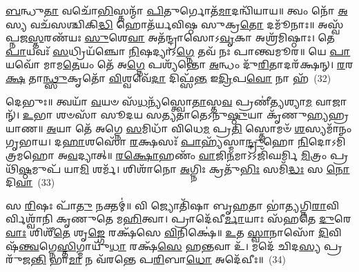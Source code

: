 \-\ul{𑌬}\-𑌨𑍍𑌧𑍁\-\ul{𑌤𑌾} 𑌵𑌚𑍋᳴\-\ul{𑌭𑌿}\-𑌸𑍍𑌤𑌨𑍍𑌮𑌾᳴ \ul{𑌪𑌿}\-𑌤𑍁𑌰𑍍𑌗𑍋𑌤᳴\-\ul{𑌮𑌾}\-𑌦𑌨𑍍𑌵𑌿᳴𑌯𑌾𑌯॥ 𑌤𑍍𑌵𑌂 𑌨𑍋᳴ \ul{𑌅}\-𑌸𑍍𑌯 𑌵𑌚᳴𑌸𑌶𑍍𑌚𑌿𑌕𑌿\-\ul{𑌦𑍍𑌧𑌿} 𑌹𑍋𑌤᳴𑌰𑍍𑌯𑌵𑌿𑌷𑍍𑌠 𑌸𑍁𑌕𑍍𑌰\-\ul{𑌤𑍋} 𑌦𑌮𑍂᳴𑌨𑌾𑌃॥ 𑌅𑌸𑍍𑌵᳴𑌪𑍍𑌨𑌜\-\ul{𑌸𑍍𑌤}\-𑌰𑌣᳴𑌯𑌃 \ul{𑌸𑍁}\-𑌶𑍇\-\ul{𑌵𑌾} 𑌅𑌤᳴𑌨𑍍𑌦𑍍𑌰𑌾𑌸𑍋\-𑌽\-\ul{𑌵𑍃}\-𑌕𑌾 𑌅𑌶𑍍𑌰᳴𑌮𑌿𑌷𑍍𑌠𑌾𑌃। 𑌤𑍇 \ul{𑌪𑌾}\-𑌯𑌵𑌃᳴ \ul{𑌸}\-𑌧𑍍𑌰𑌿𑌯᳴𑌞𑍍𑌚𑍋 \ul{𑌨𑌿}\-𑌷𑌦𑍍𑌯𑌾\-𑌽\-\ul{𑌗𑍍𑌨𑍇} 𑌤𑌵᳴ 𑌨𑌃 𑌪𑌾𑌨𑍍𑌤𑍍𑌵𑌮𑍂𑌰॥ 𑌯𑍇 \ul{𑌪𑌾}\-𑌯𑌵𑍋᳴ 𑌮𑌾𑌮\-\ul{𑌤𑍇}\-𑌯𑌂 𑌤𑍇᳴ 𑌅\-\ul{𑌗𑍍𑌨𑍇} 𑌪𑌶𑍍𑌯᳴𑌨𑍍𑌤𑍋 \ul{𑌅}\-𑌨𑍍𑌧𑌂 𑌦𑍁᳴\-\ul{𑌰𑌿}\-𑌤𑌾𑌦𑌰᳴𑌕𑍍𑌷𑌨𑍍। \ul{𑌰}\-𑌰\-\ul{𑌕𑍍𑌷} 𑌤𑌾\-\ul{𑌨𑍍𑌥𑍍𑌸𑍁}\-𑌕𑍃𑌤𑍋᳴ \ul{𑌵𑌿}\-𑌶𑍍𑌵𑌵𑍇᳴\-\ul{𑌦𑌾} 𑌦𑌿𑌫𑍍𑌸᳴\-\ul{𑌨𑍍𑌤} 𑌇\-\ul{𑌦𑍍𑌰𑌿}\-𑌪\-\ul{𑌵𑍋} 𑌨𑌾 𑌹᳴~(32)

𑌦𑍇𑌭𑍁𑌃॥ 𑌤𑍍𑌵𑌯𑌾᳴ \ul{𑌵}\-𑌯𑍞 𑌸᳴\-\ul{𑌧}\-𑌨𑍍𑌯᳴𑌸𑍍𑌤𑍍𑌵𑍋\-\ul{𑌤𑌾}\-𑌸𑍍𑌤\-\ul{𑌵} 𑌪𑍍𑌰𑌣𑍀॑𑌤𑍍𑌯𑌶𑍍𑌯𑌾\-\ul{𑌮} 𑌵𑌾𑌜𑌾𑌨𑍍᳴। \ul{𑌉}\-𑌭𑌾 𑌶𑍞𑌸𑌾᳴ 𑌸𑍂𑌦𑌯 𑌸𑌤𑍍𑌯𑌤𑌾𑌤𑍇\-𑌽𑌨𑍁\-\ul{𑌷𑍍𑌠𑍁}\-𑌯𑌾 𑌕𑍃᳴𑌣𑍁𑌹𑍍𑌯𑌹𑍍𑌰𑌯𑌾𑌣॥ \ul{𑌅}\-𑌯𑌾 𑌤𑍇᳴ 𑌅𑌗𑍍𑌨𑍇 \ul{𑌸}\-𑌮𑌿𑌧𑌾᳴ 𑌵𑌿𑌧𑍇\-\ul{𑌮} 𑌪𑍍𑌰\-\ul{𑌤𑌿} 𑌸𑍍𑌤𑍋𑌮𑍞᳴ \ul{𑌶}\-𑌸𑍍𑌯𑌮𑌾᳴𑌨𑌂 𑌗𑍃𑌭𑌾𑌯। 𑌦\-\ul{𑌹𑌾}\-𑌶𑌸𑍋᳴ \ul{𑌰}\-𑌕𑍍𑌷𑌸𑌃᳴ \ul{𑌪𑌾}\-𑌹𑍍𑌯᳴𑌸𑍍𑌮𑌾\-\ul{𑌨𑍍𑌦𑍍𑌰𑍁}\-𑌹𑍋 \ul{𑌨𑌿}\-𑌦𑍋𑌽𑌮𑌿᳴𑌤𑍍𑌰𑌮𑌹𑍋 𑌅\-\ul{𑌵}\-𑌦𑍍𑌯𑌾𑌤𑍍॥ \ul{𑌰}\-\-\ul{𑌕𑍍𑌷𑍋}\-𑌹𑌣𑌂᳴ \ul{𑌵𑌾}\-𑌜𑌿\-\ul{𑌨}\-𑌮𑌾\-𑌽\-𑌽𑌜𑌿᳴𑌘𑌰𑍍𑌮𑌿 \ul{𑌮𑌿}\-𑌤𑍍𑌰𑌂 𑌪𑍍𑌰𑌥𑌿᳴\-\ul{𑌷𑍍𑌠}\-𑌮𑍁𑌪᳴ 𑌯𑌾\-\ul{𑌮𑌿} 𑌶𑌰𑍍𑌮᳴। 𑌶𑌿𑌶𑌾᳴𑌨𑍋 \ul{𑌅}\-𑌗𑍍𑌨𑌿𑌃 𑌕𑍍𑌰𑌤𑍁᳴\-\ul{𑌭𑌿𑌃} 𑌸𑌮𑌿᳴\-\ul{𑌦𑍍𑌧𑌃} 𑌸 \ul{𑌨𑍋} 𑌦𑌿\-\ul{𑌵𑌾}\-~(33)

𑌸 \ul{𑌰𑌿}\-𑌷𑌃 𑌪𑌾᳴\-\ul{𑌤𑍁} 𑌨𑌕𑍍𑌤𑌮𑍍॑॥ 𑌵𑌿 𑌜𑍍𑌯𑍋𑌤𑌿᳴𑌷𑌾 𑌬𑍃\-\ul{𑌹}\-𑌤𑌾 𑌭𑌾॑\-\ul{𑌤𑍍𑌯}\-𑌗𑍍𑌨𑌿\-\ul{𑌰𑌾}\-𑌵𑌿𑌰𑍍𑌵𑌿𑌶𑍍𑌵𑌾᳴𑌨𑌿 𑌕𑍃𑌣𑍁𑌤𑍇 𑌮\-\ul{𑌹𑌿}\-𑌤𑍍𑌵𑌾। 𑌪𑍍𑌰𑌾𑌦𑍇᳴𑌵𑍀\-\ul{𑌰𑍍𑌮𑌾}\-𑌯𑌾𑌃 𑌸᳴𑌹𑌤𑍇 \ul{𑌦𑍁}\-𑌰𑍇\-\ul{𑌵𑌾𑌃} 𑌶𑌿𑌶𑍀᳴\-\ul{𑌤𑍇} 𑌶𑍃\-\ul{𑌙𑍍𑌗𑍇} 𑌰𑌕𑍍𑌷᳴𑌸𑍇 \ul{𑌵𑌿}\-𑌨𑌿𑌕𑍍𑌷𑍇॑॥ \ul{𑌉}\-𑌤 \ul{𑌸𑍍𑌵𑌾}\-𑌨𑌾𑌸𑍋᳴ \ul{𑌦𑌿}\-𑌵𑌿𑌷᳴\-\ul{𑌨𑍍𑌤𑍍𑌵}\-𑌗𑍍𑌨𑍇\-\ul{𑌸𑍍𑌤𑌿}\-𑌗𑍍𑌮𑌾𑌯𑍁᳴\-\ul{𑌧𑌾} 𑌰𑌕𑍍𑌷᳴\-\ul{𑌸𑍇} 𑌹\-\ul{𑌨𑍍𑌤}\-𑌵𑌾 𑌉᳴। 𑌮𑌦𑍇᳴ 𑌚𑌿𑌦\-\ul{𑌸𑍍𑌯} 𑌪𑍍𑌰𑌰𑍁᳴𑌜\-\ul{𑌨𑍍𑌤𑌿} 𑌭𑌾\-\ul{𑌮𑌾} 𑌨 𑌵᳴𑌰𑌨𑍍𑌤𑍇 𑌪\-\ul{𑌰𑌿}\-𑌬𑌾\-\ul{𑌧𑍋} 𑌅𑌦𑍇᳴𑌵𑍀𑌃॥~(34)

{}

